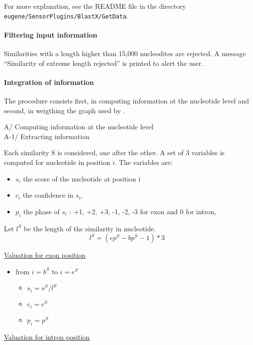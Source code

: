 For more explanation, see the README file in the directory
\texttt{eugene/SensorPlugins/BlastX/GetData}.

\paragraph{Filtering input information}

Similarities with a length higher than 15,000 nucleodites are
rejected. A message ``Similarity of extreme length rejected'' is
printed to alert the user.

\paragraph{Integration of information}

The procedure consists first, in computing information at the
nucleotide level and second, in weigthing the graph used by \EuGenie.

A/ Computing information at the nucleotide level\\
A-1/ Extracting information

Each similarity S is considered, one after the other.  A set of 3
variables is computed for nucleotide in position $i$. The variables
are:
\begin{itemize}
\item $s_i$ the score of the nucleotide at position i
\item $c_i$ the confidence in $s_i$,
\item $p_i$ the phase of $s_i$ : +1, +2, +3, -1, -2, -3 for exon and 0 for intron,
\end{itemize}
Let $l^S$ be the length of the similarity in nucleotide.
\[l^S = (ep^S -bp^S -1)*3\]

\underline{Valuation for exon position} \\

\begin{itemize}
\item from $i = b^S$ to  $i = e^S$
  \begin{itemize}
  \item $s_i = s^S / l^S$
  \item $c_i = c^S$
  \item $p_i = p^S$
  \end{itemize}
\end{itemize}

\underline{Valuation for intron position}\\

